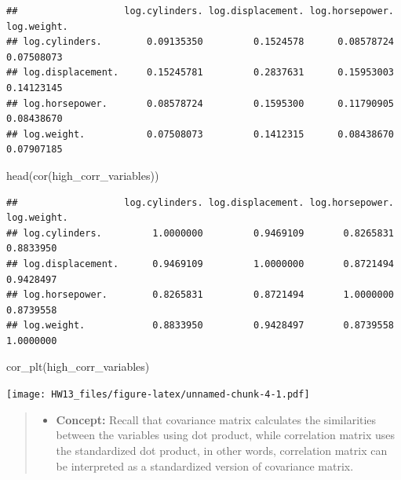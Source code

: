 \documentclass[
]{article}
\newenvironment{Shaded}{\begin{snugshade}}{\end{snugshade}}
\newcommand{\FunctionTok}[1]{\textcolor[rgb]{0.00,0.00,0.00}{#1}}
\newcommand{\NormalTok}[1]{#1}
\providecommand{\tightlist}{%
  \setlength{\itemsep}{0pt}\setlength{\parskip}{0pt}}
\begin{document}
\begin{verbatim}
##                   log.cylinders. log.displacement. log.horsepower. log.weight.
## log.cylinders.        0.09135350         0.1524578      0.08578724  0.07508073
## log.displacement.     0.15245781         0.2837631      0.15953003  0.14123145
## log.horsepower.       0.08578724         0.1595300      0.11790905  0.08438670
## log.weight.           0.07508073         0.1412315      0.08438670  0.07907185
\end{verbatim}

\begin{Shaded}
\begin{Highlighting}[]
\FunctionTok{head}\NormalTok{(}\FunctionTok{cor}\NormalTok{(high\_corr\_variables))}
\end{Highlighting}
\end{Shaded}

\begin{verbatim}
##                   log.cylinders. log.displacement. log.horsepower. log.weight.
## log.cylinders.         1.0000000         0.9469109       0.8265831   0.8833950
## log.displacement.      0.9469109         1.0000000       0.8721494   0.9428497
## log.horsepower.        0.8265831         0.8721494       1.0000000   0.8739558
## log.weight.            0.8833950         0.9428497       0.8739558   1.0000000
\end{verbatim}

\begin{Shaded}
\begin{Highlighting}[]
\FunctionTok{cor\_plt}\NormalTok{(high\_corr\_variables)}
\end{Highlighting}
\end{Shaded}

\texttt{[image: HW13\_files/figure-latex/unnamed-chunk-4-1.pdf]}

\begin{quote}
\begin{itemize}
\tightlist
\item
  \textbf{Concept:} Recall that covariance matrix calculates the
  similarities between the variables using dot product, while
  correlation matrix uses the standardized dot product, in other words,
  correlation matrix can be interpreted as a standardized version of
  covariance matrix.
\end{itemize}
\end{quote}
\end{document}
